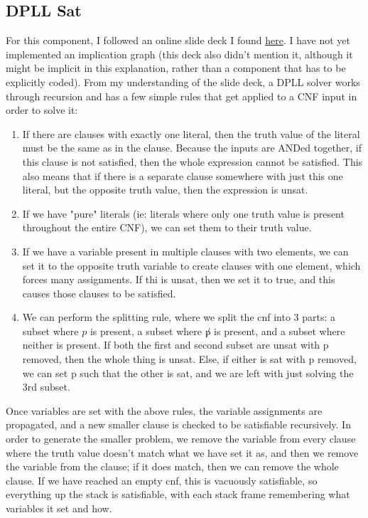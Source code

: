 \documentclass[11pt]{article}
\begin{document}
\begin{flushleft}
\section{DPLL Sat} For this component, I followed an online slide deck I found \href{file:///C:/Users/danie/AppData/Local/Microsoft/Windows/INetCache/IE/49ROXD1Y/DPLL.pdf}{here}. I have not yet implemented an implication graph (this deck also didn't mention it, although it might be implicit in this explanation, rather than a component that has to be explicitly coded).
From my understanding of the slide deck, a DPLL solver works through recursion and has a few simple rules that get applied to a CNF input in order to solve it:
\begin{enumerate}
\item If there are clauses with exactly one literal, then the truth value of the literal must be the same as in the clause. Because the inputs are ANDed together, if this clause is not satisfied, then the whole expression cannot be satisfied. This also means that if there is a separate clause somewhere with just this one literal, but the opposite truth value, then the expression is unsat.
\item If we have "pure" literals (ie: literals where only one truth value is present throughout the entire CNF), we can set them to their truth value.
\item If we have a variable present in multiple clauses with two elements, we can set it to the opposite truth variable to create clauses with one element, which forces many assignments. If thi is unsat, then we set it to true, and this causes those clauses to be satisfied.
\item We can perform the splitting rule, where we split the cnf into 3 parts: a subset where $p$ is present, a subset where $\not p$ is present, and a subset where neither is present. If both the first and second subset are unsat with p removed, then the whole thing is unsat. Else, if either is sat with p removed, we can set p such that the other is sat, and we are left with just solving the 3rd subset.
\end{enumerate}
Once variables are set with the above rules, the variable assignments are propagated, and a new smaller clause is checked to be satisfiable recursively. In order to generate the smaller problem, we remove the variable from every clause where the truth value doesn't match what we have set it as, and then we remove the variable from the clause; if it does match, then we can remove the whole clause. If we have reached an empty cnf, this is vacuously satisfiable, so everything up the stack is satisfiable, with each stack frame remembering what variables it set and how.\bigskip


\end{flushleft}
\end{document}
